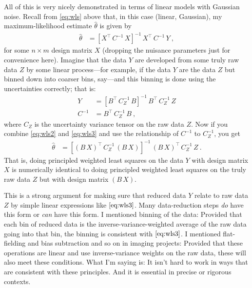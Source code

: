 \documentclass{article}
\begin{document}
All of this is very nicely demonstrated in terms of linear models with Gaussian noise.
Recall from \eqref{eq:wls} above that, in this case (linear, Gaussian), my maximum-likelihood estimate $\hat\theta$ is given by
\begin{align}
    \hat\theta &= [X^\top\,C^{-1}\,X]^{-1}\,X^\top\,C^{-1}\,Y ~,\label{eq:wls2}
\end{align}
for some $n\times m$ design matrix $X$ (dropping the nuisance parameters just for convenience here).
Imagine that the data $Y$ are developed from some truly raw data $Z$ by some linear process---for example, if the data $Y$ are the data $Z$ but binned down into coarser bins, say---and this binning is done using the uncertainties correctly; that is:
\begin{align}
    Y &= [B^\top\,C_Z^{-1}\,B]^{-1}\,B^\top\,C_Z^{-1}\,Z \label{eq:wls3} \\
    C^{-1} &= B^\top\,C_Z^{-1}\,B ~,
\end{align}
where $C_Z$ is the uncertainty variance tensor on the raw data $Z$.
Now if you combine \eqref{eq:wls2} and \eqref{eq:wls3} and use the relationship of $C^{-1}$ to $C_Z^{-1}$, you get
\begin{align}
    \hat\theta &= [(B\,X)^\top\,C_Z^{-1}\,(B\,X)]^{-1}\,(B\,X)^\top\,C_Z^{-1}\,Z ~.\label{eq:wls4}
\end{align}
That is, doing principled weighted least squares on the data $Y$ with design matrix $X$ is numerically identical to doing principled weighted least squares on the truly raw data $Z$ but with design matrix $(B\,X)$.

This is a strong argument for making sure that reduced data $Y$ relate to raw data $Z$ by simple linear expressions like $\eqref{eq:wls3}$.
Many data-reduction steps \emph{do} have this form or \emph{can} have this form.
I mentioned binning of the data: Provided that each bin of reduced data is the inverse-variance-weighted average of the raw data going into that bin, the binning is consistent with $\eqref{eq:wls3}$.
I mentioned flat-fielding and bias subtraction and so on in imaging projects:
Provided that these operations are linear and use inverse-variance weights on the raw data, these will also meet these conditions.
What I'm saying is: It isn't hard to work in ways that are consistent with these principles.
And it is essential in precise or rigorous contexts.
\end{document}
